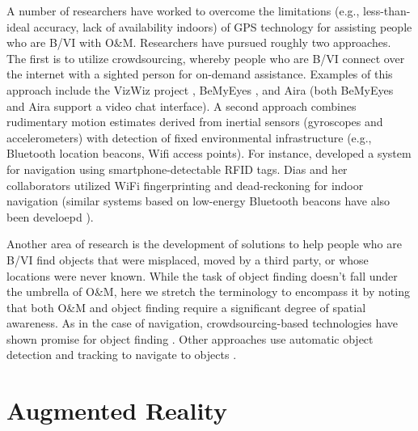 \documentclass[chi_draft]{sigchi}
\newcommand{\BVI}{B/VI\xspace}
\newcommand{\OM}{O\&M\xspace}
\begin{document}
A number of researchers have worked to overcome the limitations (e.g., less-than-ideal accuracy, lack of availability indoors) of GPS technology for assisting people who are \BVI with \OM.  Researchers have pursued roughly two approaches.  The first is to utilize crowdsourcing, whereby people who are \BVI connect over the internet with a sighted person for on-demand assistance.  Examples of this approach include the VizWiz project \cite{bigham2010vizwiz}, BeMyEyes \cite{bemyeyesaccessworld}, and Aira \cite{aira} (both BeMyEyes and Aira support a video chat interface).  A second approach combines rudimentary motion estimates derived from inertial sensors (gyroscopes and accelerometers) with detection of fixed environmental infrastructure (e.g., Bluetooth location beacons, Wifi access points).  For instance, \cite{ganz2015percept, ganz2011percept, ganz2014percept} developed a system for navigation using smartphone-detectable RFID tags.  Dias and her collaborators utilized WiFi fingerprinting and dead-reckoning for indoor navigation \cite{Dias__2014_7778} (similar systems based on low-energy Bluetooth beacons have also been develoepd \cite{ishihara2017beacon, ahmetovic2016navcog, ahmetovic2017achieving}).

Another area of research is the development of solutions to help people who are \BVI find objects that were misplaced, moved by a third party, or whose locations were never known.  While the task of object finding doesn't fall under the umbrella of \OM, here we stretch the terminology to encompass it by noting that both \OM and object finding require a significant degree of spatial awareness.  As in the case of navigation, crowdsourcing-based technologies have shown promise for object finding \cite{bigham2010vizwizlocateit}.  Other approaches use automatic object detection and tracking to navigate to objects \cite{schauerte2012assistive, jafri2014computer, thakoor2014system}.

\section{Augmented Reality}
%
\end{document}
